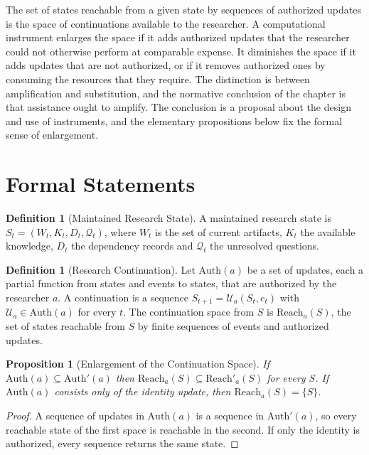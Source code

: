 \documentclass[11pt,letterpaper]{report}
\theoremstyle{plain}
\newtheorem{proposition}[theorem]{Proposition}
\theoremstyle{definition}
\newtheorem{definition}[theorem]{Definition}
\theoremstyle{remark}
\begin{document}
The set of states reachable from a given state by sequences of authorized updates is the space of continuations available to the researcher. A computational instrument enlarges the space if it adds authorized updates that the researcher could not otherwise perform at comparable expense. It diminishes the space if it adds updates that are not authorized, or if it removes authorized ones by consuming the resources that they require. The distinction is between amplification and substitution, and the normative conclusion of the chapter is that assistance ought to amplify. The conclusion is a proposal about the design and use of instruments, and the elementary propositions below fix the formal sense of enlargement.

\section{Formal Statements}

\begin{definition}[Maintained Research State]\label{def:researchstate}
A maintained research state is $S_t=(W_t,K_t,D_t,\mathcal Q_t)$, where $W_t$ is the set of current artifacts, $K_t$ the available knowledge, $D_t$ the dependency records and $\mathcal Q_t$ the unresolved questions.
\end{definition}

\begin{definition}[Research Continuation]\label{def:researchcont}
Let $\mathrm{Auth}(a)$ be a set of updates, each a partial function from states and events to states, that are authorized by the researcher $a$. A continuation is a sequence $S_{t+1}=\mathcal U_a(S_t,e_t)$ with $\mathcal U_a\in\mathrm{Auth}(a)$ for every $t$. The continuation space from $S$ is $\mathrm{Reach}_a(S)$, the set of states reachable from $S$ by finite sequences of events and authorized updates.
\end{definition}

\begin{proposition}[Enlargement of the Continuation Space]\label{pr:reachmono}
If $\mathrm{Auth}(a)\subseteq\mathrm{Auth}'(a)$ then $\mathrm{Reach}_a(S)\subseteq\mathrm{Reach}'_a(S)$ for every $S$. If $\mathrm{Auth}(a)$ consists only of the identity update, then $\mathrm{Reach}_a(S)=\{S\}$.
\end{proposition}
\begin{proof}
A sequence of updates in $\mathrm{Auth}(a)$ is a sequence in $\mathrm{Auth}'(a)$, so every reachable state of the first space is reachable in the second. If only the identity is authorized, every sequence returns the same state.
\end{proof}
\end{document}
